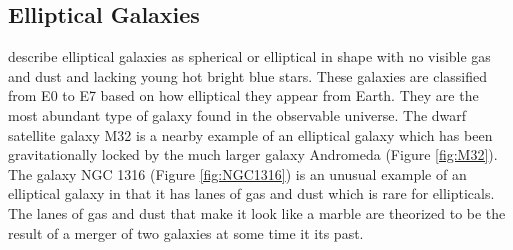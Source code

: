 \documentclass[12pt, oneside]{smuthesis}
\begin{document}
\subsection{\sc Elliptical Galaxies} \label{ellipticalGalaxies}

\cite{sag} describe elliptical galaxies as spherical or elliptical in shape with no visible gas and dust and lacking young hot bright blue stars. These galaxies are classified from E0 to E7 based on how elliptical they appear from Earth. They are the most abundant type of galaxy found in the observable universe. The dwarf satellite galaxy M32 is a nearby example of an elliptical galaxy which has been gravitationally locked by the much larger galaxy Andromeda (Figure \ref{fig:M32}). The galaxy NGC 1316 (Figure \ref{fig:NGC1316}) is an unusual example of an elliptical galaxy in that it has lanes of gas and dust which is rare for ellipticals. The lanes of gas and dust that make it look like a marble are theorized to be the result of a merger of two galaxies at some time it its past.
\end{document}
